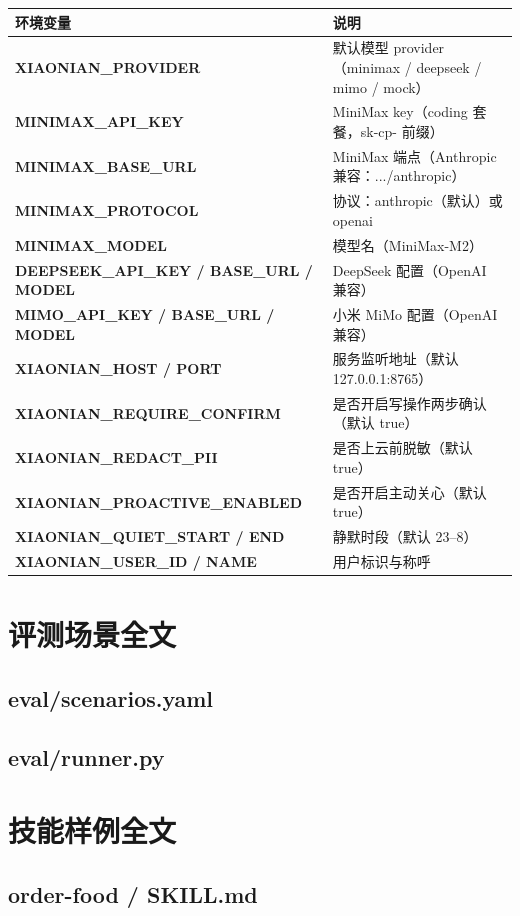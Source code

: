 {\small
\begin{xltabular}{\linewidth}{>{\bfseries\ttfamily\footnotesize}p{5.0cm} X}
\toprule
环境变量 & 说明 \\
\midrule
\endhead
XIAONIAN\_PROVIDER & 默认模型 provider（minimax / deepseek / mimo / mock） \\
MINIMAX\_API\_KEY & MiniMax key（coding 套餐，sk-cp- 前缀） \\
MINIMAX\_BASE\_URL & MiniMax 端点（Anthropic 兼容：.../anthropic） \\
MINIMAX\_PROTOCOL & 协议：anthropic（默认）或 openai \\
MINIMAX\_MODEL & 模型名（MiniMax-M2） \\
DEEPSEEK\_API\_KEY / BASE\_URL / MODEL & DeepSeek 配置（OpenAI 兼容） \\
MIMO\_API\_KEY / BASE\_URL / MODEL & 小米 MiMo 配置（OpenAI 兼容） \\
XIAONIAN\_HOST / PORT & 服务监听地址（默认 127.0.0.1:8765） \\
XIAONIAN\_REQUIRE\_CONFIRM & 是否开启写操作两步确认（默认 true） \\
XIAONIAN\_REDACT\_PII & 是否上云前脱敏（默认 true） \\
XIAONIAN\_PROACTIVE\_ENABLED & 是否开启主动关心（默认 true） \\
XIAONIAN\_QUIET\_START / END & 静默时段（默认 23--8） \\
XIAONIAN\_USER\_ID / NAME & 用户标识与称呼 \\
\bottomrule
\end{xltabular}}


\chapter{评测场景全文}
\section{eval/scenarios.yaml}

\section{eval/runner.py}



\chapter{技能样例全文}
\section{order-food / SKILL.md}

